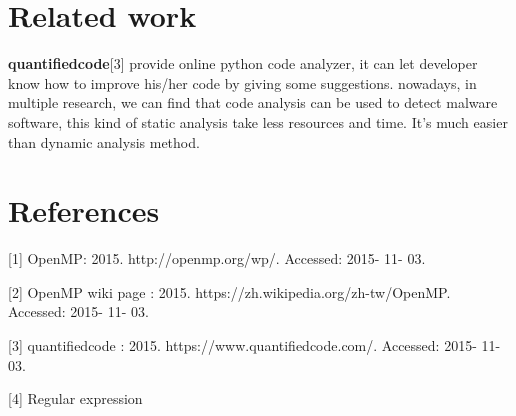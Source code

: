 \documentclass{acm_proc_article-sp}
\begin{document}
\section{Related work}

	\textbf{quantifiedcode}[3] provide online python code analyzer, it can let developer 
	know how to improve his/her code by giving some suggestions.
	nowadays, in multiple research, we can find that code analysis can be used to 
	detect malware software, this kind of static analysis take less resources and time. 
	It’s much easier than dynamic analysis method.



\section{References}
[1] OpenMP: 2015. http://openmp.org/wp/. Accessed: 2015- 11- 03.

[2] OpenMP wiki page : 2015. https://zh.wikipedia.org/zh-tw/OpenMP. Accessed: 2015- 11- 03.

[3] quantifiedcode : 2015. https://www.quantifiedcode.com/. Accessed: 2015- 11- 03.

[4] Regular expression
\end{document}
